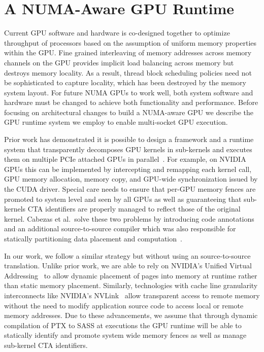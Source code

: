 \vspace{-0.1in}
\section{A NUMA-Aware GPU Runtime}

Current GPU software and hardware is co-designed together to optimize 
throughput of processors based on the assumption of uniform memory properties 
within the GPU. Fine grained interleaving of memory addresses across memory 
channels on the GPU provides implicit load balancing across memory but destroys 
memory locality.  As a result, thread block scheduling policies need not 
be sophisticated to capture locality, which has been destroyed by the 
memory system layout.  For future NUMA GPUs to work well, both system software and 
hardware must be changed to achieve both functionality and performance.  Before 
focusing on architectural changes to build a NUMA-aware GPU we describe the GPU 
runtime system we employ to enable multi-socket GPU execution.

Prior work has demonstrated it is possible to design a framework and a runtime 
system that transparently decomposes GPU kernels in sub-kernels and executes 
them on multiple PCIe attached GPUs in parallel~\cite{Cabezas2015, kim2011achieving, lee2013transparent}. 
For example, on NVIDIA GPUs 
this can be implemented by intercepting and remapping each kernel call, GPU 
memory allocation, memory copy, and GPU-wide synchronization issued by the CUDA 
driver. Special care needs to ensure that per-GPU memory fences are promoted to 
system level and seen by all GPUs as well as guaranteeing that sub-kernels CTA 
identifiers are properly managed to reflect those of the original kernel. Cabezas et al.~solve 
these two problems by introducing  code 
annotations and an additional source-to-source compiler which was also 
responsible for statically partitioning data placement and computation~\cite{Cabezas2015}.

In our work, we follow a similar strategy but without using an source-to-source
translation. Unlike prior work, we are able to rely on NVIDIA's Unified Virtual 
Addressing~\cite{UVM} to allow dynamic placement of pages into memory at
runtime rather than static memory placement.  Similarly, technologies with
cache line granularity interconnects like NVIDIA's NVLink~\cite{NVLINK} allow
transparent access to remote memory without the need to modify application
source code to access local or remote memory addresses.  Due to these
advancements, we assume that through dynamic compilation of PTX to SASS at
executions the GPU runtime will be able to statically identify and promote 
system wide memory fences as well as manage sub-kernel CTA identifiers.

